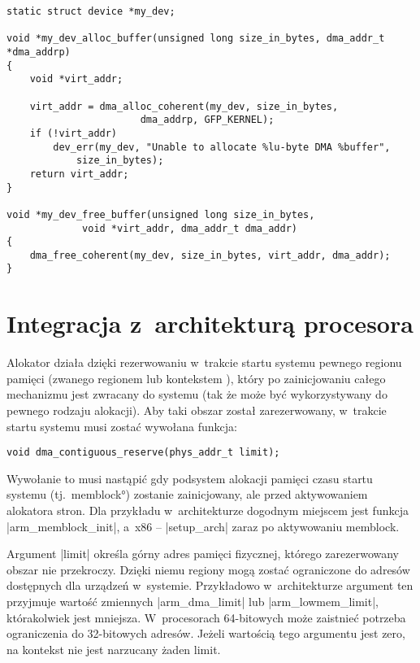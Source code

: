 \begin{lstlisting}[float=tbhp,caption={Alokacja bufora \acc{DMA} z~użyciem
      \acc{DMA} \acc{API}.},label=lst:dma-alloc-example]
static struct device *my_dev;

void *my_dev_alloc_buffer(unsigned long size_in_bytes, dma_addr_t *dma_addrp)
{
	void *virt_addr;

	virt_addr = dma_alloc_coherent(my_dev, size_in_bytes,
				       dma_addrp, GFP_KERNEL);
	if (!virt_addr)
		dev_err(my_dev, "Unable to allocate %lu-byte DMA %buffer",
			size_in_bytes);
	return virt_addr;
}

void *my_dev_free_buffer(unsigned long size_in_bytes,
			 void *virt_addr, dma_addr_t dma_addr)
{
	dma_free_coherent(my_dev, size_in_bytes, virt_addr, dma_addr);
}
\end{lstlisting}


\section{Integracja z~architekturą procesora}\label{sec:integrate-with-arch}

Alokator  działa dzięki rezerwowaniu w~trakcie startu systemu
pewnego regionu pamięci (zwanego regionem lub kontekstem ), który
po zainicjowaniu całego mechanizmu  jest zwracany do systemu (tak
że może być wykorzystywany do pewnego rodzaju alokacji).  Aby taki
obszar został zarezerwowany, w~trakcie startu systemu musi zostać
wywołana funkcja:

\begin{lstlisting}
void dma_contiguous_reserve(phys_addr_t limit);
\end{lstlisting}

Wywołanie to musi nastąpić gdy podsystem alokacji pamięci czasu startu
systemu (tj.\ \ang*{memblock}) zostanie zainicjowany, ale przed
aktywowaniem alokatora stron.  Dla przykładu w~architekturze 
dogodnym miejscem jest funkcja \code|arm_memblock_init|, a~x86 --
\code|setup_arch| zaraz po aktywowaniu memblock.

Argument \code|limit| określa górny adres pamięci fizycznej, którego
zarezerwowany obszar  nie przekroczy.  Dzięki niemu regiony 
mogą zostać ograniczone do adresów dostępnych dla urządzeń w~systemie.
Przykładowo w~architekturze  argument ten przyjmuje wartość
zmiennych \code|arm_dma_limit| lub \code|arm_lowmem_limit|,
którakolwiek jest mniejsza.  W~procesorach 64-bitowych może zaistnieć
potrzeba ograniczenia do 32-bitowych adresów.  Jeżeli wartością tego
argumentu jest zero, na kontekst  nie jest narzucany żaden limit.

